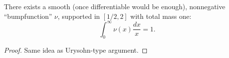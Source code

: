 \begin{theorem}[SmoothExistence]
\label{SmoothExistence}
\leanok
There exists a smooth (once differentiable would be enough),
  nonnegative ``bumpfunction'' $\nu$,
  supported in $[1/2,2]$ with total mass one:
  $$
  \int_0^\infty \nu(x)\frac{dx}{x} = 1.
  $$
\end{theorem}
\begin{proof}
\leanok
Same idea as Urysohn-type argument.
\end{proof}

